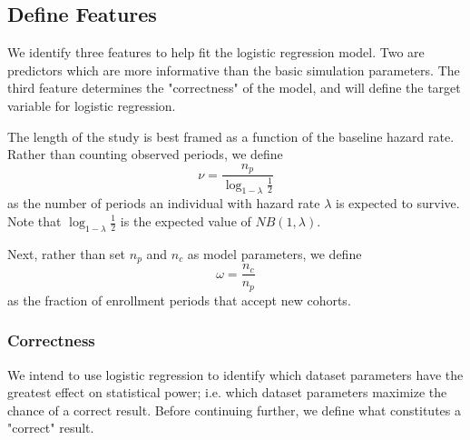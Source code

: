 \subsection{Define Features}

We identify three features to help fit the logistic regression model. Two are predictors which are more informative than the basic simulation parameters. The third feature determines the "correctness" of the model, and will define the target variable for logistic regression.

The length of the study is best framed as a function of the baseline hazard rate. Rather than counting observed periods, we define
%
\begin{equation}
\label{eq:nu}
    \nu = \frac{n_p}{\log_{1-\lambda}\frac{1}{2}}  
\end{equation}
%
as the number of periods an individual with hazard rate $\lambda$ is expected to survive. Note that $\log_{1-\lambda}\frac{1}{2}$ is the expected value of $NB(1, \lambda)$. 

Next, rather than set $n_p$ and $n_c$ as model parameters, we define
%
\begin{equation}
\label{eq:omega}
    \omega = \frac{n_c}{n_p}    
\end{equation}
%
as the fraction of enrollment periods that accept new cohorts.

\subsubsection{Correctness}

We intend to use logistic regression to identify which dataset parameters have the greatest effect on statistical power; i.e. which dataset parameters maximize the chance of a correct result. Before continuing further, we define what constitutes a "correct" result. 


